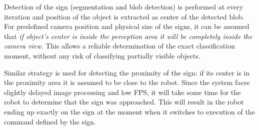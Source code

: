 Detection of the sign (segmentation and blob detection) is performed at every iteration and position of the object is extracted as center of the detected blob. For predefined camera position and physical size of the signs, it can be assumed that \textit{if object's center is inside the perception area it will be completely inside the camera view}. This allows a reliable determination of the exact classification moment, without any risk of classifying partially visible objects.

Similar strategy is used for detecting the proximity of the sign: if its center is in the proximity area it is assumed to be close to the robot. Since the system faces slightly delayed image processing and low FPS, it will take some time for the robot to determine that the sign was approached. This will result in the robot ending up exactly on the sign at the moment when it switches to execution of the command defined by the sign.
